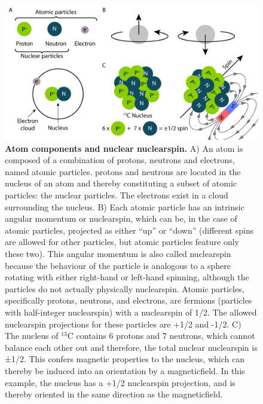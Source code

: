 \begin{figure}[tbh!]
    \centering
    \includegraphics[width=1\linewidth]{figures/spin_nucleous.pdf}
    \caption{\textbf{Atom components and nuclear \gls{nuclearspin}.} A) An atom is composed of a combination of \glspl{proton}, \glspl{neutron} and \glspl{electron}, named atomic particles. \Glspl{proton} and \glspl{neutron} are located in the \gls{nucleus} of an atom and thereby constituting a subset of atomic particles: the nuclear particles. The \glspl{electron} exist in a cloud surrounding the \gls{nucleus}. B) Each atomic particle has an intrinsic angular momentum or \gls{nuclearspin}, which can be, in the case of atomic particles, projected as either ``up'' or ``down'' (different spins are allowed for other particles, but atomic particles feature only these two). This angular momentum is also called \gls{nuclearspin} because the behaviour of the particle is analogous to a sphere rotating with either right-hand or left-hand spinning, although the particles do not actually physically \gls{nuclearspin}. Atomic particles, specifically \glspl{proton}, \glspl{neutron}, and \glspl{electron}, are fermions (particles with half-integer \gls{nuclearspin}) with a \gls{nuclearspin} of 1/2. The allowed \gls{nuclearspin} projections for these particles are +1/2 and -1/2. C) The \gls{nucleus} of $^{13}\text{C}$ contains 6 \glspl{proton} and 7 \glspl{neutron}, which cannot balance each other out and therefore, the total nuclear \gls{nuclearspin} is ±1/2. This confers magnetic properties to the \gls{nucleus}, which can thereby be induced into an orientation by a \gls{magneticfield}. In this example, the \gls{nucleus} has a +1/2 \gls{nuclearspin} projection, and is thereby oriented in the same direction as the \gls{magneticfield}. 
    }
    \label{fig:chapter1:atom}
\end{figure}

